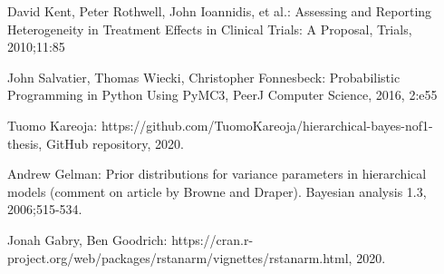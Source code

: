 \documentclass[12pt,a4paper,leqno]{report}
\theoremstyle{plain}
\theoremstyle{definition}
\theoremstyle{remark}
\begin{document}
\begin{thebibliography}{4}
    David Kent, Peter Rothwell, John Ioannidis, et al.: Assessing and Reporting Heterogeneity in
    Treatment Effects in Clinical Trials: A Proposal, Trials, 2010;11:85

    John Salvatier, Thomas Wiecki, Christopher Fonnesbeck: Probabilistic Programming in Python Using PyMC3, PeerJ Computer
    Science, 2016, 2:e55

    Tuomo Kareoja: https://github.com/TuomoKareoja/hierarchical-bayes-nof1-thesis,
    GitHub repository, 2020.

    Andrew Gelman: Prior distributions for variance parameters in hierarchical models
    (comment on article by Browne and Draper). Bayesian analysis 1.3, 2006;515-534.

    Jonah Gabry, Ben Goodrich: https://cran.r-project.org/web/packages/rstanarm/vignettes/rstanarm.html, 2020.

\end{thebibliography}
\end{document}
